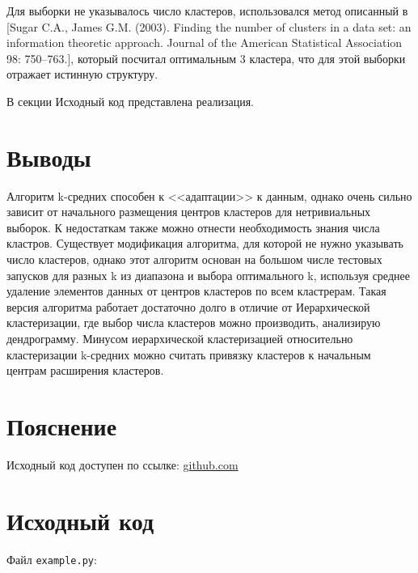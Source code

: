 \documentclass{article} %
\begin{document}
Для выборки не указывалось число кластеров,
использовался метод описанный в
[Sugar C.A., James G.M. (2003).
Finding the number of clusters in a data set: an information theoretic approach.
Journal of the American Statistical Association 98: 750–763.],
который посчитал оптимальным 3 кластера,
что для этой выборки отражает истинную структуру.

В секции Исходный код представлена реализация.

\section{Выводы}

Алгоритм k-средних способен к <<адаптации>> к данным,
однако очень сильно зависит от начального размещения центров кластеров
для нетривиальных выборок.
К недостаткам также можно отнести необходимость знания числа кластров.
Существует модификация алгоритма,
для которой не нужно указывать число кластеров,
однако этот алгоритм основан на большом числе
тестовых запусков для разных k из диапазона
и выбора оптимального k, используя
среднее удаление элементов данных от центров кластеров
по всем кластрерам.
Такая версия алгоритма работает достаточно долго
в отличие от Иерархической кластеризации,
где выбор числа кластеров можно производить,
анализирую дендрограмму.
Минусом иерархической кластеризацией относительно
кластеризации k-средних можно считать привязку
кластеров к начальным центрам расширения кластеров.

\section{Пояснение}
Исходный код доступен по ссылке:
\href{https://github.com/SvichkarevAnatoly/Course-Python-Bioinformatics/tree/master/semester2/task2}
{github.com}

\section{Исходный код}
Файл \verb$example.py$:

\end{document}
